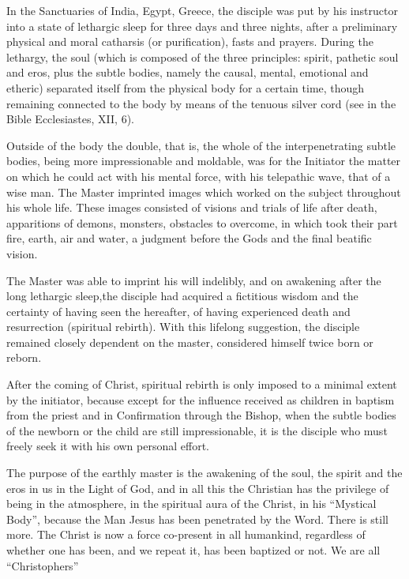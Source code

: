 \begin{quotationx}
In the Sanctuaries of India, Egypt, Greece, the disciple was put by his instructor into a state of lethargic sleep for three days and three nights, after a preliminary physical and moral catharsis (or purification), fasts and prayers. During the lethargy, the soul (which is composed of the three principles: spirit, pathetic soul and eros, plus the subtle bodies, namely the causal, mental, emotional and etheric) separated itself from the physical body for a certain time, though remaining connected to the body by means of the tenuous silver cord (see in the Bible Ecclesiastes, XII, 6).

Outside of the body the double, that is, the whole of the interpenetrating subtle bodies, being more impressionable and moldable, was for the Initiator the matter on which he could act with his mental force, with his telepathic wave, that of a wise man. The Master imprinted images which worked on the subject throughout his whole life. These images consisted of visions and trials of life after death, apparitions of demons, monsters, obstacles to overcome, in which took their part fire, earth, air and water, a judgment before the Gods and the final beatific vision.

The Master was able to imprint his will indelibly, and on awakening after the long lethargic sleep,the disciple had acquired a fictitious wisdom and the certainty of having seen the hereafter, of having experienced death and resurrection (spiritual rebirth). With this lifelong suggestion, the disciple remained closely dependent on the master, considered himself twice born or reborn.

After the coming of Christ, spiritual rebirth is only imposed to a minimal extent by the initiator, because except for the influence received as children in baptism from the priest and in Confirmation through the Bishop, when the subtle bodies of the newborn or the child are still impressionable, it is the disciple who must freely seek it with his own personal effort.

The purpose of the earthly master is the awakening of the soul, the spirit and the eros in us in the Light of God, and in all this the Christian has the privilege of being in the atmosphere, in the spiritual aura of the Christ, in his ``Mystical Body'', because the Man Jesus has been penetrated by the Word. There is still more. The Christ is now a force co-present in all humankind, regardless of whether one has been, and we repeat it, has been baptized or not. We are all ``Christophers''
\end{quotationx}


